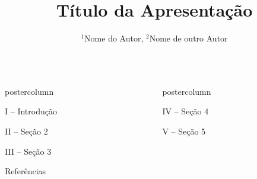 \documentclass[final,hyperref={pdfpagelabels=false}]{beamer}
\title{\Huge Título da Apresentação}
\author{\Large $^1$Nome do Autor, $^2$Nome de outro Autor}
\institute[UNESP]{$^1$Universidade Estadual Paulista "Júlio de Mesquita Filho", $^2$Segunda Filiação}
\newlength{\columnheight}
\begin{document}
\begin{frame}
	\begin{columns}
		\begin{column}{.45\textwidth}
			\begin{beamercolorbox}[center,wd=\textwidth]{postercolumn}
				\begin{minipage}[T]{.95\textwidth}  
					\parbox[t][\columnheight]{\textwidth}{
						\begin{block}{\vspace*{-7pt} \large I -- Introdução}                    
						\end{block}
						\vspace*{14pt}
						            
						\begin{block}{\vspace*{-7pt} \large II -- Seção 2}
						\end{block}               
						\vspace*{14pt}
						            
						\begin{block}{\vspace*{-7pt} \large III -- Seção 3}
						\end{block}
						\vspace*{14pt}
						        
						\begin{block}{\vspace*{-7pt} \large Referências}
							{\small
								
								}
						\end{block}
					}
				\end{minipage}
			\end{beamercolorbox}
		\end{column}

		\begin{column}{.54\textwidth}
			\begin{beamercolorbox}[center,wd=\textwidth]{postercolumn}
				\begin{minipage}[T]{.95\textwidth}
					\parbox[t][\columnheight]{\textwidth}{
						\begin{block}{\vspace*{-7pt} \large IV -- Seção 4}	
						\end{block}
						\vspace*{14pt}
						
						\begin{block}{\vspace*{-7pt} \large V -- Seção 5}		
						\end{block}
						\vspace*{14pt}
						
}
\end{minipage}
\end{beamercolorbox}
\end{column}
\end{columns}
\end{frame}
\end{document}
